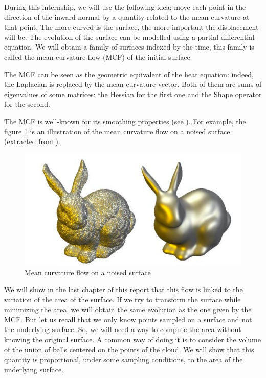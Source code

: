 During this internship, we will use the following idea: move each point in the
direction of the inward normal by a quantity related to the mean curvature at
that point. The more curved is the surface, the more important the displacement
will be. The evolution of the surface can be modelled using a partial
differential equation. We will obtain a family of surfaces indexed by the time,
this family is called the mean curvature flow (MCF) of the initial surface.

The MCF can be seen as the geometric equivalent of the heat equation: indeed,
the Laplacian is replaced by the mean curvature vector. Both of them are sums of
eigenvalues of some matrices: the Hessian for the first one and the Shape
operator for the second.


The MCF is well-known for its smoothing properties (see
\cite{ciomaga2010level}). For example, the figure
\ref{fig:mean-curvature-flow-ex} is an illustration of the mean curvature flow
on a noised surface (extracted from \cite{clarenz2000anisotropic}).

\begin{figure}[h]
    \centering
    \includegraphics[scale=0.3]{img/mean-curvature-flow-rabbit}
    \caption{Mean curvature flow on a noised surface}
    \label{fig:mean-curvature-flow-ex}
\end{figure}

We will show in the last chapter of this report that this flow is linked to the
variation of the area of the surface. If we try to transform the surface while
minimizing the area, we will obtain the same evolution as the one given by the
MCF. But let us recall that we only know points sampled on a surface and not the
underlying surface. So, we will need a way to compute the area without knowing
the original surface. A common way of doing it is to consider the volume of the
union of balls centered on the points of the cloud.  We will show that this
quantity is proportional, under some sampling conditions, to the area of the
underlying surface.

